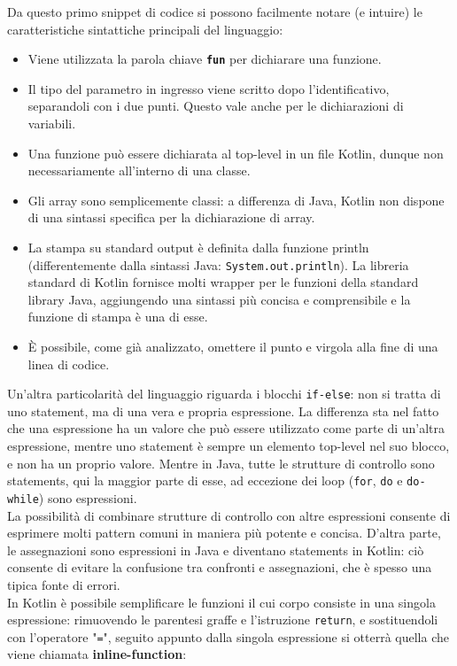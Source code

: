 Da questo primo snippet di codice si possono facilmente notare (e intuire) le caratteristiche sintattiche principali del linguaggio:
\begin{itemize}
  \item Viene utilizzata la parola chiave {\bfseries \texttt{fun}} per dichiarare una funzione.
  \item Il tipo del parametro in ingresso viene scritto dopo l’identificativo, separandoli con i due punti. Questo vale anche per le dichiarazioni di variabili.
  \item Una funzione può essere dichiarata al top-level in un file Kotlin, dunque non necessariamente all’interno di una classe.
  \item Gli array sono semplicemente classi: a differenza di Java, Kotlin non dispone di una sintassi specifica per la dichiarazione di array.
  \item La stampa su standard output è definita dalla funzione println (differentemente dalla sintassi Java: \texttt{System.out.println}). La libreria standard di Kotlin fornisce molti wrapper per le funzioni della standard library Java, aggiungendo una sintassi più concisa e comprensibile e la funzione di stampa è una di esse.
  \item È possibile, come già analizzato, omettere il punto e virgola alla fine di una linea di codice.
\end{itemize}

Un’altra particolarità del linguaggio riguarda i blocchi \texttt{if-else}: non si tratta di uno statement, ma di una vera e propria espressione. La differenza sta nel fatto che una espressione ha un valore che può
essere utilizzato come parte di un'altra espressione, mentre uno statement è sempre un elemento top-level nel suo blocco, e non ha un proprio valore. Mentre in Java, tutte le strutture di controllo sono statements, qui la maggior parte di esse, ad eccezione dei loop (\texttt{for}, \texttt{do} e \texttt{do-while}) sono espressioni.\\
La possibilità di combinare strutture di controllo con altre espressioni consente di esprimere molti pattern comuni in maniera più potente e concisa. D'altra parte, le assegnazioni sono espressioni in Java e diventano statements in Kotlin: ciò consente di evitare la confusione tra confronti e assegnazioni, che è spesso una tipica fonte di errori.\\
In Kotlin è possibile semplificare le funzioni il cui corpo consiste in una singola espressione: rimuovendo le parentesi graffe e l'istruzione \texttt{return}, e sostituendoli con l'operatore "\texttt{=}", seguito appunto dalla singola espressione si otterrà quella che viene chiamata {\bfseries inline-function}:

